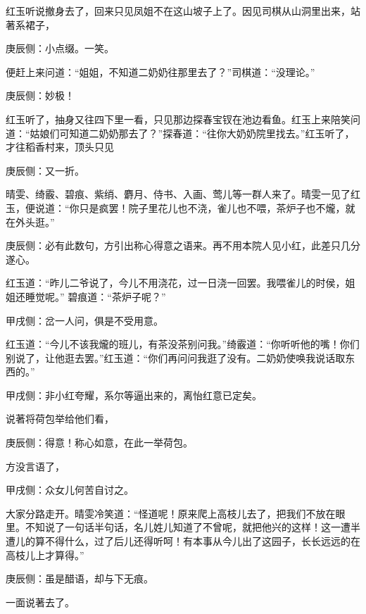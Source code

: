 \begin{parag}
    红玉听说撤身去了，回来只见凤姐不在这山坡子上了。因见司棋从山洞里出来，站著系裙子，\begin{note}庚辰侧：小点缀。一笑。\end{note}便赶上来问道：“姐姐，不知道二奶奶往那里去了？”司棋道：“没理论。”\begin{note}庚辰侧：妙极！\end{note}红玉听了，抽身又往四下里一看，只见那边探春宝钗在池边看鱼。红玉上来陪笑问道：“姑娘们可知道二奶奶那去了？”探春道：“往你大奶奶院里找去。”红玉听了，才往稻香村来，顶头只见\begin{note}庚辰侧：又一折。\end{note} 晴雯、绮霰、碧痕、紫绡、麝月、侍书、入画、莺儿等一群人来了。晴雯一见了红玉，便说道：“你只是疯罢！院子里花儿也不浇，雀儿也不喂，茶炉子也不爖，就在外头逛。”\begin{note}庚辰侧：必有此数句，方引出称心得意之语来。再不用本院人见小红，此差只几分遂心。\end{note} 红玉道：“昨儿二爷说了，今儿不用浇花，过一日浇一回罢。我喂雀儿的时侯，姐姐还睡觉呢。” 碧痕道：“茶炉子呢？”\begin{note}甲戌侧：岔一人问，俱是不受用意。\end{note}红玉道：“今儿不该我爖的班儿，有茶没茶别问我。”绮霰道：“你听听他的嘴！你们别说了，让他逛去罢。”红玉道：“你们再问问我逛了没有。二奶奶使唤我说话取东西的。”\begin{note}甲戌侧：非小红夸耀，系尔等逼出来的，离怡红意已定矣。\end{note}说著将荷包举给他们看，\begin{note}庚辰侧：得意！称心如意，在此一举荷包。\end{note}方没言语了， \begin{note}甲戌侧：众女儿何苦自讨之。\end{note}大家分路走开。晴雯冷笑道：“怪道呢！原来爬上高枝儿去了，把我们不放在眼里。不知说了一句话半句话，名儿姓儿知道了不曾呢，就把他兴的这样！这一遭半遭儿的算不得什么，过了后儿还得听呵！有本事从今儿出了这园子，长长远远的在高枝儿上才算得。”\begin{note}庚辰侧：虽是醋语，却与下无痕。\end{note}一面说著去了。
\end{parag}


